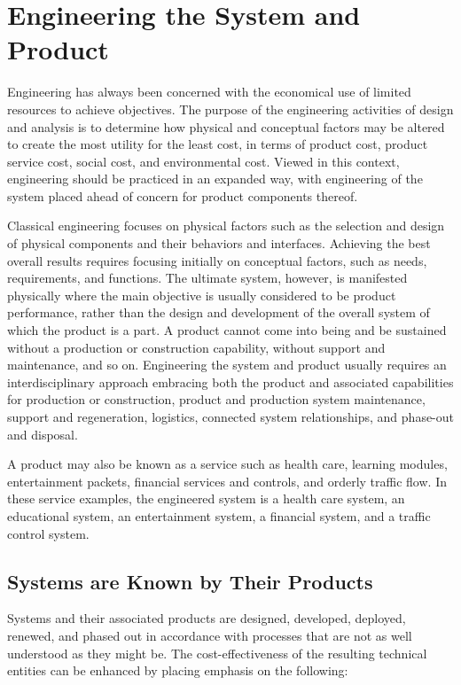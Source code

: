 \section{Engineering the System and Product}

Engineering has always been concerned with the economical use of limited resources to achieve objectives. The purpose of the engineering activities of design and analysis is to determine how physical and conceptual factors may be altered to create the most utility for the least cost, in terms of product cost, product service cost, social cost, and environmental cost. Viewed in this context, engineering should be practiced in an expanded way, with engineering of the system placed ahead of concern for product components thereof.

Classical engineering focuses on physical factors such as the selection and design of physical components and their behaviors and interfaces. Achieving the best overall results requires focusing initially on conceptual factors, such as needs, requirements, and functions. The ultimate system, however, is manifested physically where the main objective is usually considered to be product performance, rather than the design and development of the overall system of which the product is a part. A product cannot come into being and be sustained without a production or construction capability, without support and maintenance, and so on. Engineering the system and product usually requires an interdisciplinary approach embracing both the product and associated capabilities for production or construction, product and production system maintenance, support and regeneration, logistics, connected system relationships, and phase-out and disposal.

A product may also be known as a service such as health care, learning modules, entertainment packets, financial services and controls, and orderly traffic flow. In these service examples, the engineered system is a health care system, an educational system, an entertainment system, a financial system, and a traffic control system.

\subsection{Systems are Known by Their Products}

Systems and their associated products are designed, developed, deployed, renewed, and phased out in accordance with processes that are not as well understood as they might be. The cost-effectiveness of the resulting technical entities can be enhanced by placing emphasis on the following:

